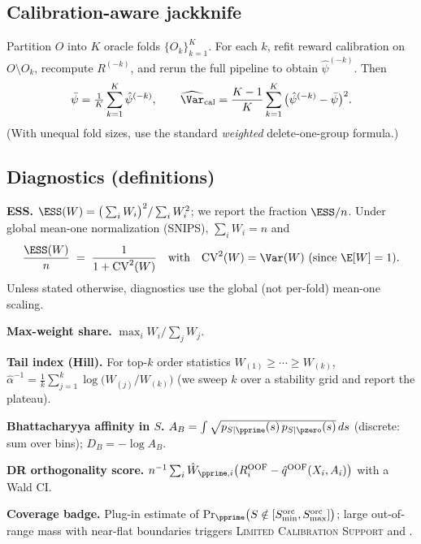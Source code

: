 \subsection{Calibration-aware jackknife}
\label{app:oua}
Partition $O$ into $K$ oracle folds $\{O_k\}_{k=1}^K$. For each $k$, refit reward calibration on $O\setminus O_k$, recompute $R^{(-k)}$, and rerun the full pipeline to obtain $\hat\psi^{(-k)}$. Then
\[
\bar\psi=\tfrac{1}{K}\sum_{k=1}^K \hat\psi^{(-k)},
\qquad
\widehat{\Var}_{\mathrm{cal}}=\frac{K-1}{K}\sum_{k=1}^K \big(\hat\psi^{(-k)}-\bar\psi\big)^2.
\]
(With unequal fold sizes, use the standard \emph{weighted} delete-one-group formula.)

\subsection{Diagnostics (definitions)}
\label{app:diagnostics-defs}
\textbf{ESS.} $\ESS(W)=\big(\sum_i W_i\big)^2/\sum_i W_i^2$; we report the fraction $\ESS/n$. Under global mean-one normalization (SNIPS), $\sum_i W_i=n$ and
\[
\frac{\ESS(W)}{n}\;=\;\frac{1}{1+\mathrm{CV}^2(W)}\quad\text{with}\quad \mathrm{CV}^2(W)=\Var(W)\ \text{(since }\E[W]=1\text{)}.
\]
Unless stated otherwise, diagnostics use the global (not per-fold) mean-one scaling.

\noindent\textbf{Max-weight share.} $\max_i W_i\big/\sum_j W_j$.

\noindent\textbf{Tail index (Hill).} For top-$k$ order statistics $W_{(1)}\ge\cdots\ge W_{(k)}$,
$\hat\alpha^{-1}=\tfrac{1}{k}\sum_{j=1}^k \log\!\big(W_{(j)}/W_{(k)}\big)$ (we sweep $k$ over a stability grid and report the plateau).

\noindent\textbf{Bhattacharyya affinity in $S$.} $A_B=\int \sqrt{p_{S|\pprime}(s)\,p_{S|\pzero}(s)}\,ds$ (discrete: sum over bins); $D_B=-\log A_B$.

\noindent\textbf{DR orthogonality score.} $n^{-1}\sum_i \hat W_{\pprime,i}\big(R^{\mathrm{OOF}}_i-\hat q^{\mathrm{OOF}}(X_i,A_i)\big)$ with a Wald CI.

\noindent\textbf{Coverage badge.} Plug-in estimate of $\Pr_{\pprime}\!\big(S\notin [S_{\min}^{\mathrm{orc}},S_{\max}^{\mathrm{orc}}]\big)$; large out-of-range mass with near-flat boundaries triggers \textsc{Limited Calibration Support} and \RefuseLevel.

